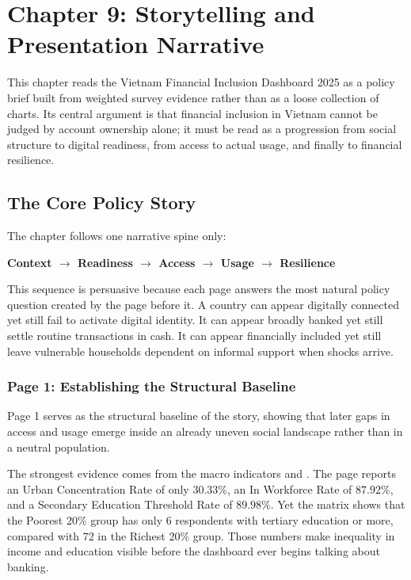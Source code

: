 \documentclass[../main.tex]{subfiles}
\begin{document}
\section{Chapter 9: Storytelling and Presentation Narrative}
\label{sec:data-storytelling-design-opening}

This chapter reads the Vietnam Financial Inclusion Dashboard 2025 as a policy
brief built from weighted survey evidence rather than as a loose collection of
charts. Its central argument is that financial inclusion in Vietnam cannot be
judged by account ownership alone; it must be read as a progression from social
structure to digital readiness, from access to actual usage, and finally to
financial resilience.


\subsection{The Core Policy Story}
\label{subsec:dashboard-purpose-storytelling-lens}

The chapter follows one narrative spine only:

\begin{center}
\textbf{Context \(\rightarrow\) Readiness \(\rightarrow\) Access \(\rightarrow\) Usage \(\rightarrow\) Resilience}
\end{center}

This sequence is persuasive because each page answers the most natural policy
question created by the page before it. A country can appear digitally
connected yet still fail to activate digital identity. It can appear broadly
banked yet still settle routine transactions in cash. It can appear financially
included yet still leave vulnerable households dependent on informal support
when shocks arrive.

\subsubsection{Page 1: Establishing the Structural Baseline}
\label{subsubsec:page1-context}

Page 1 serves as the structural baseline of the story, showing that later gaps
in access and usage emerge inside an already uneven social landscape rather than
in a neutral population.

The strongest evidence comes from the macro indicators and
. The page reports an Urban
Concentration Rate of only \(30.33\%\), an In Workforce Rate of \(87.92\%\),
and a Secondary Education Threshold Rate of \(89.98\%\). Yet the matrix shows
that the Poorest 20\% group has only 6 respondents with tertiary education or
more, compared with 72 in the Richest 20\% group. Those numbers make inequality
in income and education visible before the dashboard ever begins talking about
banking.
\end{document}
